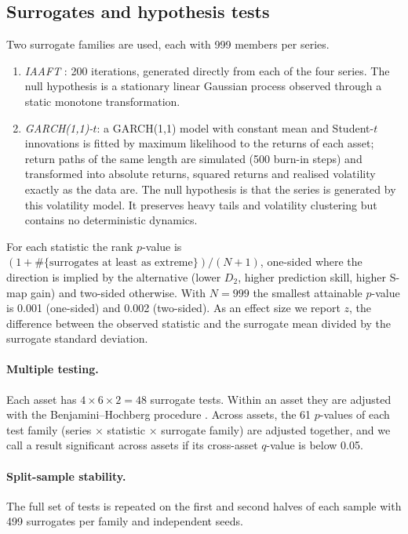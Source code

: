\documentclass[11pt,a4paper]{article}
\begin{document}
\subsection{Surrogates and hypothesis tests}
Two surrogate families are used, each with 999 members per series.
\begin{enumerate}
\item \emph{IAAFT} \citep{SchreiberSchmitz1996}: 200 iterations, generated directly from each of the four series.
The null hypothesis is a stationary linear Gaussian process observed through a static monotone transformation.
\item \emph{GARCH(1,1)-$t$}: a GARCH(1,1) model with constant mean and Student-$t$ innovations
\citep{Bollerslev1986,Bollerslev1987} is fitted by maximum likelihood to the returns of each asset; return paths of
the same length are simulated (500 burn-in steps) and transformed into absolute returns, squared returns and
realised volatility exactly as the data are. The null hypothesis is that the series is generated by this
volatility model. It preserves heavy tails and volatility clustering but contains no deterministic dynamics.
\end{enumerate}
For each statistic the rank $p$-value is $(1+\#\{\text{surrogates at least as extreme}\})/(N+1)$, one-sided where the
direction is implied by the alternative (lower $D_2$, higher prediction skill, higher S-map gain) and two-sided
otherwise. With $N=999$ the smallest attainable $p$-value is 0.001 (one-sided) and 0.002 (two-sided). As an effect size we
report $z$, the difference between the observed statistic and the surrogate mean divided by the surrogate standard
deviation.

\paragraph{Multiple testing.} Each asset has $4\times 6\times 2=48$ surrogate tests. Within an asset they are adjusted
with the Benjamini--Hochberg procedure \citep{BenjaminiHochberg1995}. Across assets, the 61 $p$-values of each test
family (series $\times$ statistic $\times$ surrogate family) are adjusted together, and we call a result significant
across assets if its cross-asset $q$-value is below 0.05.

\paragraph{Split-sample stability.} The full set of tests is repeated on the first and second halves of each sample
with 499 surrogates per family and independent seeds.
\end{document}
